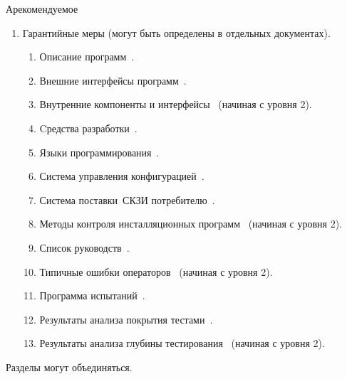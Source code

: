 \begin{appendix}{А}{рекомендуемое}
\begin{enumerate}
\begin{enumerate}
\item
Настройка среды для защиты системных объектов~.

\item
Настройка среды для защиты сеансов~.

\item
Отслеживание уязвимостей КСК~ (начиная с уровня 2).

\end{enumerate}

\item
Гарантийные меры (могут быть определены в отдельных документах).
\begin{enumerate}
\item
Описание программ~.

\item
Внешние интерфейсы программ~.

\item
Внутренние компоненты и интерфейсы~
(начиная с уровня 2).

\item
Cредства разработки~.

\item
Языки программирования~.

\item
Система управления конфигурацией~.

\item
Система поставки~СКЗИ потребителю~.

\item
Методы контроля инсталляционных программ~
(начиная с уровня 2).

\item
Список руководств~.

\item
Типичные ошибки операторов~
(начиная с уровня 2).

\item
Программа испытаний~.

\item
Результаты анализа покрытия тестами~.

\item
Результаты анализа глубины тестирования~
(начиная с уровня 2).
\end{enumerate}
\end{enumerate}

Разделы могут объединяться.

\end{appendix}

